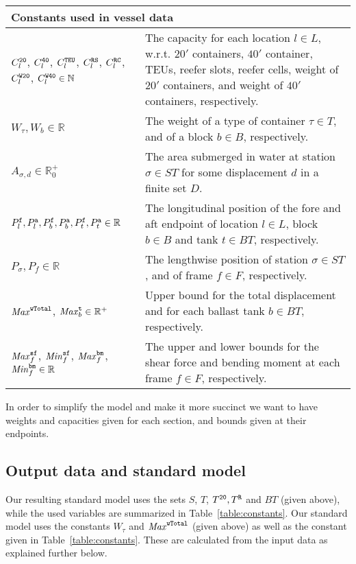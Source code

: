 \vspace{1mm}
\noindent
\begin{tabular}{p{4.5cm}p{8cm}}
\multicolumn{2}{l}{\textbf{Constants used in vessel data}}\\
\hline\noalign{\smallskip}
$C_l^{\texttt{20}}$, $C_l^{\texttt{40}}$, $C_l^{\texttt{TEU}}$, $C_l^{\texttt{RS}}$, $C_l^{\texttt{RC}}$, 
$C_l^{\texttt{W20}}$, $C_l^{\texttt{W40}}\in \mathbb{N}$ & The capacity for each location $l\in L$, w.r.t. $20'$ containers, $40'$ container, TEUs, reefer slots, reefer cells, weight of $20'$ containers, and weight of $40'$ containers, respectively.\\
$W_\tau, W_b\in \mathbb{R}$ & The weight of a type of container $\tau\in T$, and of a block $b\in B$, respectively. \\
$A_{\sigma,d}\in \mathbb{R}^+_0$ & The area submerged in water at station $\sigma\in ST$ for some displacement $d$ in a finite set $D$.\\
$P^{\texttt{f}}_l, P^{\texttt{a}}_l, P^{\texttt{f}}_b, P^{\texttt{a}}_b, P^{\texttt{f}}_t, P^{\texttt{a}}_t\in\mathbb{R}$ & The longitudinal position of the fore and aft endpoint of location $l\in L$, block $b \in B$ and tank $t \in BT$, respectively.\\
$P_\sigma, P_f\in \mathbb{R}$& The lengthwise position of station $\sigma\in ST$, and of frame $f\in F$, respectively.\\
$\mathit{Max}^{\texttt{wTotal}}$, $\mathit{Max}^{\texttt{t}}_b\in \mathbb{R}^+$& Upper bound for the total displacement and for each ballast tank $b\in BT$, respectively.\\
$\mathit{Max}^{\texttt{sf}}_f$, $\mathit{Min}^{\texttt{sf}}_f$, $\mathit{Max}^{\texttt{bm}}_f$, $\mathit{Min}^{\texttt{bm}}_f\in\mathbb{R}$ & The upper and lower bounds for the shear force and bending moment at each frame $f\in F$, respectively.\\
\end{tabular}

\vspace{1mm}
\noindent
In order to simplify the model and make it more succinct we want to have weights and capacities given for each section, and bounds given at their endpoints.  

\subsection*{Output data and standard model}
Our resulting standard model uses the sets $S$, $T$, $T^{\texttt{20}}, T^{\texttt{R}}$ and $BT$ (given above), while the used variables are summarized in Table~\ref{table:constants}. Our standard model uses the constants $W_\tau$ and $\mathit{Max}^{\texttt{wTotal}}$ (given above) as well as the constant given in Table~\ref{table:constants}. These are calculated from the input data as explained further below.

